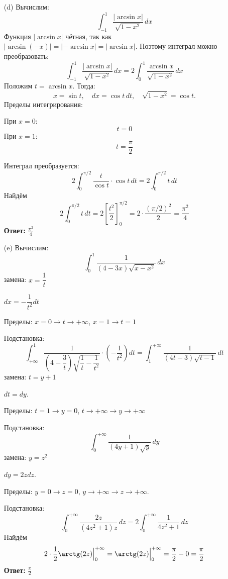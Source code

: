 \documentclass[a4paper]{article}
\begin{document}
\begin{enumerate}
\begin{enumerate}
    \item[(d)]Вычислим:
    \[
    \int_{-1}^1 \frac{|\arcsin x|}{\sqrt{1 - x^2}} \, dx
    \]  
    Функция \(|\arcsin x|\) чётная, так как \(|\arcsin(-x)| = 
    |-\arcsin x| = |\arcsin x|\). Поэтому интеграл можно преобразовать:  
    \[
    \int_{-1}^1 \frac{|\arcsin x|}{\sqrt{1 - x^2}} \,
     dx = 2 \int_{0}^1 \frac{\arcsin x}{\sqrt{1 - x^2}} \, dx
    \]
    Положим \(t = \arcsin x\). Тогда:  
    \[
    x = \sin t, \quad dx = \cos t \, dt, \quad \sqrt{1 - x^2} = \cos t. 
    \]  
    Пределы интегрирования:  
    
    При \(x = 0\): \[t = 0\]  
    При \(x = 1\): \[t = \dfrac{\pi}{2}\]  

    Интеграл преобразуется:  
    \[
    2 \int_{0}^{\pi/2} \frac{t}{\cos t} \cdot \cos t \, dt = 2 \int_{0}^{\pi/2} t \, dt
    \]
    Найдём
    \[
    2 \int_{0}^{\pi/2} t \, dt = 2 \left[ \frac{t^2}{2} \right]_{0}^{\pi/2} =
     2 \cdot \frac{(\pi/2)^2}{2} = \frac{\pi^2}{4}
    \]
    \textbf{Ответ: } $\frac{\pi^2}{4}$\\

    \item[(e)]Вычислим:
    \[
    \int_{0}^{1} \frac{1}{(4 - 3x)\sqrt{x - x^2}} \, dx
    \]  
    замена: \(x = \dfrac{1}{t}\)

    \(dx = -\dfrac{1}{t^2} dt\)

    Пределы: \(x = 0 \to t \to +\infty\), \(x = 1 \to t = 1\)

    Подстановка:  
    \[
    \int_{+\infty}^{1} \frac{1}{\left(4 - \dfrac{3}{t}\right)\sqrt{\dfrac{1}{t} 
    - \dfrac{1}{t^2}}} \cdot \left(-\dfrac{1}{t^2}\right) dt =
     \int_{1}^{+\infty} \frac{1}{(4t - 3)\sqrt{t - 1}} \, dt
    \]
    замена: \(t = y + 1\)
    
    \(dt = dy\).  
   
    Пределы: \(t = 1 \to y = 0\), \(t \to +\infty \to y \to +\infty\)
   
    Подстановка:  
    \[
    \int_{0}^{+\infty} \frac{1}{(4y + 1)\sqrt{y}} \, dy
    \]
    замена: \(y = z^2\)

    \(dy = 2z dz\).  
   
    Пределы: \(y = 0 \to z = 0\), \(y \to +\infty \to z \to +\infty\).
   
    Подстановка:  
     \[
     \int_{0}^{+\infty} \frac{2z}{(4z^2 + 1)z} \, dz = 2 \int_{0}^{+\infty} 
     \frac{1}{4z^2 + 1} \, dz
     \]
    Найдём
    \[
    2 \cdot \frac{1}{2} \arctg(2z) \Big|_{0}^{+\infty} = 
    \arctg(2z) \Big|_{0}^{+\infty} = \frac{\pi}{2} - 0 = \frac{\pi}{2}
    \]
    \textbf{Ответ: } $\frac{\pi}{2}$\\


\end{enumerate}
\end{enumerate}
\end{document}

